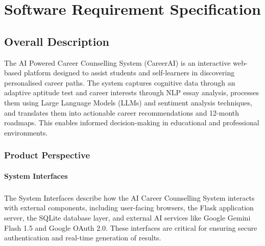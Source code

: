 \chapter{Software Requirement Specification}
\section{{Overall Description}}
{}The AI Powered Career Counselling System (CareerAI) is an interactive web-based platform designed to assist students and self-learners in discovering personalised career paths. The system captures cognitive data through an adaptive aptitude test and career interests through NLP essay analysis, processes them using Large Language Models (LLMs) and sentiment analysis techniques, and translates them into actionable career recommendations and 12-month roadmaps. This enables informed decision-making in educational and professional environments.


\subsection{{Product Perspective}}

\subsubsection{{System Interfaces}}
\paragraph{}{The System Interfaces describe how the AI Career Counselling System interacts with external components, including user-facing browsers, the Flask application server, the SQLite database layer, and external AI services like Google Gemini Flash 1.5 and Google OAuth 2.0. These interfaces are critical for ensuring secure authentication and real-time generation of results.}

